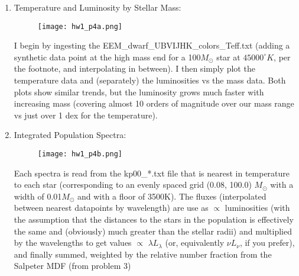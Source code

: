 \documentclass[11pt]{article}
\begin{document}
\begin{enumerate}
    \begin{enumerate}
  	  \item %
  	  Temperature and Luminosity by Stellar Mass:
  	  
		  \begin{figure}[H]
	  		\texttt{[image: hw1\_p4a.png]}
	  		\label{fig:fig7}
		  \end{figure}
		  
	I begin by ingesting the EEM\_dwarf\_UBVIJHK\_colors\_Teff.txt (adding a synthetic data point at the high mass end for a 100$M_{\odot}$ star at $45000^{\circ} K$, per the footnote, and interpolating in between). I then simply plot the temperature data and (separately) the luminosities vs the mass data. Both plots show similar trends, but the luminosity grows much faster with increasing mass (covering almost 10 orders of magnitude over our mass range vs just over 1 dex for the temperature).\\

\newpage 		  
		  
	\item %
	  	  Integrated Population Spectra:
	  	  
		  \begin{figure}[H]
			  		\texttt{[image: hw1\_p4b.png]}
			  		\label{fig:fig8}
		  \end{figure}
		  

	Each spectra is read from the kp00\_*.txt file that is nearest in temperature to each star (corresponding to an evenly spaced grid (0.08, 100.0) $M_{\odot}$ with a width of 0.01$M_{\odot}$ and with a floor of 3500K). The fluxes (interpolated between nearest datapoints by wavelength) are use as $\propto$ luminosities (with the assumption that the distances to the stars in the population is effectively the same and (obviously) much greater than the stellar radii) and multiplied by the wavelengths to get values $\propto$ $\lambda L_{\lambda}$ (or, equivalently $\nu L_{\nu}$, if you prefer), and finally summed, weighted by the relative number fraction from the Salpeter MDF (from problem 3)
	

\end{enumerate}
\end{enumerate}
\end{document}
